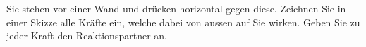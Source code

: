 Sie stehen vor einer Wand und drücken horizontal gegen diese. Zeichnen Sie in einer Skizze alle Kräfte ein, welche dabei von aussen auf Sie wirken. Geben Sie zu jeder Kraft den Reaktionspartner an.
